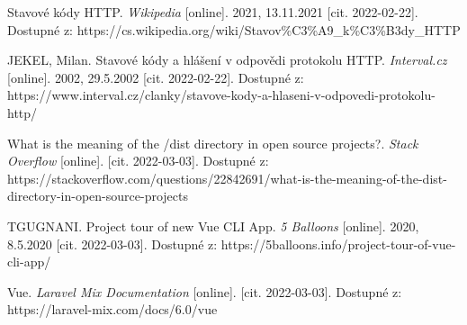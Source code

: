 \begin{thebibliography}{55}
Stavové kódy HTTP. \textit{Wikipedia} [online]. 2021, 13.11.2021 [cit. 2022-02-22]. Dostupné z: https://cs.wikipedia.org/wiki/Stavov\%C3\%A9\_k\%C3\%B3dy\_HTTP

JEKEL, Milan. Stavové kódy a hlášení v odpovědi protokolu HTTP. \textit{Interval.cz} [online]. 2002, 29.5.2002 [cit. 2022-02-22]. Dostupné z: https://www.interval.cz/clanky/stavove-kody-a-hlaseni-v-odpovedi-protokolu-http/

What is the meaning of the /dist directory in open source projects?. \textit{Stack Overflow} [online]. [cit. 2022-03-03]. Dostupné z: https://stackoverflow.com/questions/22842691/what-is-the-meaning-of-the-dist-directory-in-open-source-projects

TGUGNANI. Project tour of new Vue CLI App. \textit{5 Balloons} [online]. 2020, 8.5.2020 [cit. 2022-03-03]. Dostupné z: https://5balloons.info/project-tour-of-vue-cli-app/

Vue. \textit{Laravel Mix Documentation} [online]. [cit. 2022-03-03]. Dostupné z: https://laravel-mix.com/docs/6.0/vue

\end{thebibliography}